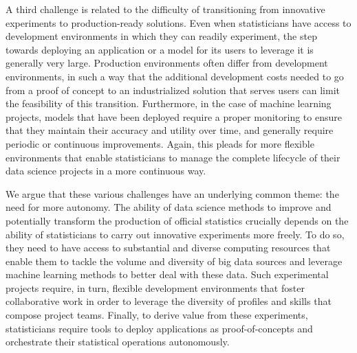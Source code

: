 A third challenge is related to the difficulty of transitioning from innovative experiments to production-ready solutions. Even when statisticians have access to development environments in which they can readily experiment, the step towards deploying an application or a model for its users to leverage it is generally very large. Production environments often differ from development environments, in such a way that the additional development costs needed to go from a proof of concept to an industrialized solution that serves users can limit the feasibility of this transition. Furthermore, in the case of machine learning projects, models that have been deployed require a proper monitoring to ensure that they maintain their accuracy and utility over time, and generally require periodic or continuous improvements. Again, this pleads for more flexible environments that enable statisticians to manage the complete lifecycle of their data science projects in a more continuous way.

We argue that these various challenges have an underlying common theme: the need for more autonomy. The ability of data science methods to improve and potentially transform the production of official statistics crucially depends on the ability of statisticians to carry out innovative experiments more freely. To do so, they need to have access to substantial and diverse computing resources that enable them to tackle the volume and diversity of big data sources and leverage machine learning methods to better deal with these data. Such experimental projects require, in turn, flexible development environments that foster collaborative work in order to leverage the diversity of profiles and skills that compose project teams. Finally, to derive value from these experiments, statisticians require tools to deploy applications as proof-of-concepts and orchestrate their statistical operations autonomously.

